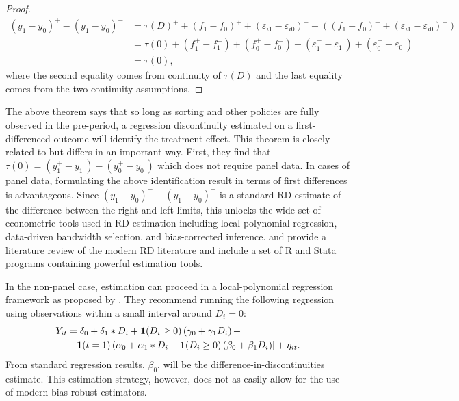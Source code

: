\documentclass[12pt]{article}
\begin{document}
\begin{proof}
    \begin{align*}
        (y_1 - y_0)^+ - (y_1 - y_0)^- &= \tau(D)^{+} + (f_1 - f_0)^+  + (\varepsilon_{i1} - \varepsilon_{i0})^+ - ((f_1 - f_0)^-  + (\varepsilon_{i1} - \varepsilon_{i0})^-) \\
        &= \tau(0) + (f_1^+ - f_1^-) + (f_0^+ - f_0^-) + (\varepsilon_1^+ - \varepsilon_1^-) + (\varepsilon_0^+ - \varepsilon_0^-) \\
        &= \tau(0),
    \end{align*}
    where the second equality comes from continuity of $\tau(D)$ and the last equality comes from the two continuity assumptions.
\end{proof}

The above theorem says that so long as sorting and other policies are fully observed in the pre-period, a regression discontinuity estimated on a first-differenced outcome will identify the treatment effect. This theorem is closely related to \citet{Grembi_Nannicini_Troiano_2016} but differs in an important way. First, they find that $\tau(0) = (y_1^+ - y_1^-) - (y_0^+ - y_0^-)$ which does not require panel data. In cases of panel data, formulating the above identification result in terms of first differences is advantageous. Since $(y_1 - y_0)^+ - (y_1 - y_0)^-$ is a standard RD estimate of the difference between the right and left limits, this  unlocks the wide set of econometric tools used in RD estimation including local polynomial regression, data-driven bandwidth selection, and bias-corrected inference. \citet{Cattaneo_Idrobo_Titiunik_2019} and \citet{Cattaneo_Idrobo_Titiunik} provide a literature review of the modern RD literature and include a set of R and Stata programs containing powerful estimation tools.


In the non-panel case, estimation can proceed in a local-polynomial regression framework as proposed by \citet{Grembi_Nannicini_Troiano_2016}. They recommend running the following regression using observations within a small interval around $D_i = 0$: 
\begin{align*}
    Y_{it} &= \delta_0 + \delta_1 * D_{i} + \mathbf{1}(D_i \geq 0) \left( \gamma_0 + \gamma_1 D_i \right) + \\ 
    &\quad \mathbf{1}(t = 1) \left( \alpha_0 + \alpha_1 * D_{i} + \mathbf{1}(D_i \geq 0) \left( \beta_0 + \beta_1 D_i \right) \right] + \eta_{it}.
\end{align*}
From standard regression results, $\beta_0$, will be the difference-in-discontinuities estimate. This estimation strategy, however, does not as easily allow for the use of modern bias-robust estimators.
\end{document}

